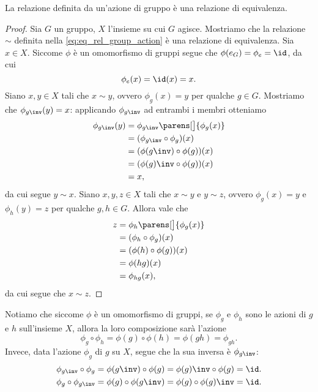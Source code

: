 \begin{proposition}{}{}
    La relazione definita da un'azione di gruppo è una relazione di equivalenza.
\end{proposition}
\begin{proof}
    Sia $G$ un gruppo, $X$ l'insieme su cui $G$ agisce. Mostriamo che la relazione $\sim$ definita nella \eqref{eq:eq_rel_group_action} è una relazione di equivalenza.
     Sia $x \in X$. Siccome $\phi$ è un omomorfismo di gruppi segue che $\phi(e_G) = \phi_e = \id$, da cui \[
        \phi_e(x) = \id(x) = x.    
    \]
     Siano $x, y \in X$ tali che $x \sim y$, ovvero $\phi_g(x) = y$ per qualche $g \in G$. Mostriamo che $\phi_{g\inv}(y) = x$: applicando $\phi_{g\inv}$ ad entrambi i membri otteniamo \begin{align*}
        \phi_{g\inv}(y) &= \phi_{g\inv}\parens[\big]{\phi_g(x)} \\
        &= (\phi_{g\inv} \circ \phi_g)(x)\\
        &= (\phi(g\inv) \circ \phi(g))(x)\\
        &= (\phi(g)\inv \circ \phi(g))(x)\\
        &= x,
    \end{align*} da cui segue $y \sim x$.
     Siano $x, y, z \in X$ tali che $x \sim y$ e $y \sim z$, ovvero $\phi_g(x) = y$ e $\phi_h(y) = z$ per qualche $g, h \in G$. Allora vale che \begin{align*}
        z &= \phi_h\parens[\big]{\phi_g(x)}\\
        &= (\phi_{h} \circ \phi_g)(x)\\
        &= (\phi(h) \circ \phi(g))(x)\\
        &= \phi(hg)(x)\\
        &= \phi_{hg}(x),
    \end{align*} da cui segue che $x \sim z$.
\end{proof}

\begin{remark}
    Notiamo che siccome $\phi$ è un omomorfismo di gruppi, se $\phi_g$ e $\phi_h$ sono le azioni di $g$ e $h$ sull'insieme $X$, allora la loro composizione sarà l'azione \[
        \phi_g \circ \phi_h = \phi(g) \circ \phi(h) = \phi(gh) = \phi_{gh}.    
    \] Invece, data l'azione $\phi_g$ di $g$ su $X$, segue che la sua inversa è $\phi_{g\inv}$: \begin{gather*}
        \phi_{g\inv} \circ \phi_g = \phi(g\inv) \circ \phi(g) = \phi(g)\inv \circ \phi(g) = \id.\\   
        \phi_g \circ \phi_{g\inv} = \phi(g) \circ \phi(g\inv) = \phi(g) \circ \phi(g)\inv = \id.\\ 
    \end{gather*}
\end{remark}

